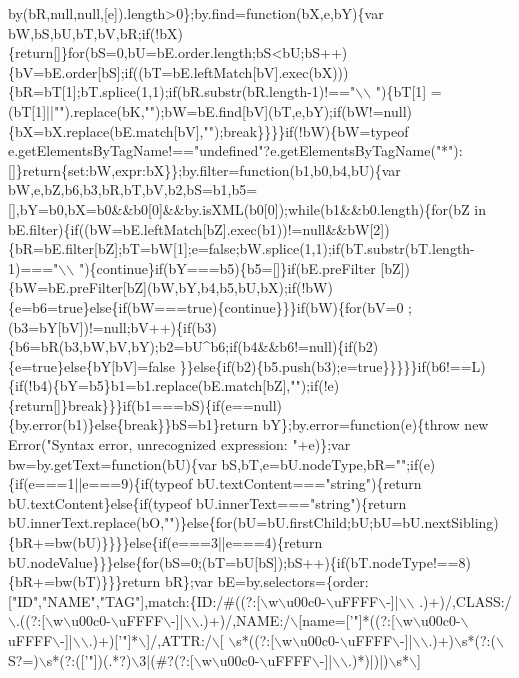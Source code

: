 \begin{DoxyCode}
{       by(bR,null,null,[e]).length>0\};by.find=function(bX,e,bY)\{var
       bW,bS,bU,bT,bV,bR;if(!bX)\{return[]\}for(bS=0,bU=bE.order.length;bS<bU;bS++)\{bV=bE.order[bS];if((bT=bE.leftMatch[bV].exec(bX)))\{bR=bT[1];bT.splice(1,1);if(bR.substr(bR.length-1)!=="\(\backslash\)\(\backslash\)
      ")\{bT[1]
      =(bT[1]||"").replace(bK,"");bW=bE.find[bV](bT,e,bY);if(bW!=null)\{bX=bX.replace(bE.match[bV],"");break\}\}\}\}if(!bW)\{bW=typeof
       e.getElementsByTagName!=="undefined"?e.getElementsByTagName("*"):[]\}return\{set:bW,expr:bX\}\};by.filter=function(b1,b0,b4,bU)\{var
       bW,e,bZ,b6,b3,bR,bT,bV,b2,bS=b1,b5=[],bY=b0,bX=b0&&b0[0]&&by.isXML(b0[0]);while(b1&&b0.length)\{for(bZ in
       bE.filter)\{if((bW=bE.leftMatch[bZ].exec(b1))!=null&&bW[2])\{bR=bE.filter[bZ];bT=bW[1];e=false;bW.splice(1,1);if(bT.substr(bT.length-1)==="\(\backslash\)\(\backslash\)
      ")\{continue\}if(bY===b5)\{b5=[]\}if(bE.preFilter
      [bZ])\{bW=bE.preFilter[bZ](bW,bY,b4,b5,bU,bX);if(!bW)\{e=b6=true\}else\{if(bW===true)\{continue\}\}\}if(bW)\{for(bV=0
      ;(b3=bY[bV])!=null;bV++)\{if(b3)\{b6=bR(b3,bW,bV,bY);b2=bU^b6;if(b4&&b6!=null)\{if(b2)\{e=true\}else\{bY[bV]=false
      \}\}else\{if(b2)\{b5.push(b3);e=true\}\}\}\}\}if(b6!==L)\{if(!b4)\{bY=b5\}b1=b1.replace(bE.match[bZ],"");if(!e)\{return[]\}break\}\}\}if(b1===bS)\{if(e==null)\{by.error(b1)\}else\{break\}\}bS=b1\}return bY\};by.error=function(e)\{throw new
       Error("Syntax error, unrecognized expression: "+e)\};var bw=by.getText=function(bU)\{var
       bS,bT,e=bU.nodeType,bR="";if(e)\{if(e===1||e===9)\{if(typeof bU.textContent==="string")\{return bU.textContent\}else\{if(typeof
       bU.innerText==="string")\{return
       bU.innerText.replace(bO,"")\}else\{for(bU=bU.firstChild;bU;bU=bU.nextSibling)\{bR+=bw(bU)\}\}\}\}else\{if(e===3||e===4)\{return
       bU.nodeValue\}\}\}else\{for(bS=0;(bT=bU[bS]);bS++)\{if(bT.nodeType!==8)\{bR+=bw(bT)\}\}\}return bR\};var bE=by.selectors=\{order:["ID","NAME","TAG"],match:\{ID:/#((?:[\(\backslash\)w\(\backslash\)u00c0-\(\backslash\)uFFFF\(\backslash\)-]|\(\backslash\)\(\backslash\)
      .)+)/,CLASS:/\(\backslash\).((?:[\(\backslash\)w\(\backslash\)u00c0-\(\backslash\)uFFFF\(\backslash\)-]|\(\backslash\)\(\backslash\).)+)/,NAME:/\(\backslash\)[name=['}\textcolor{stringliteral}{"]*((?:[\(\backslash\)w\(\backslash\)u00c0-\(\backslash\)uFFFF\(\backslash\)-]|\(\backslash\)\(\backslash\).)+)['"}]*\(\backslash\)]/,ATTR:/\(\backslash\)[
      \(\backslash\)s*((?:[\(\backslash\)w\(\backslash\)u00c0-\(\backslash\)uFFFF\(\backslash\)-]|\(\backslash\)\(\backslash\).)+)\(\backslash\)s*(?:(\(\backslash\)S?=)\(\backslash\)s*(?:([\textcolor{stringliteral}{'"])(.*?)\(\backslash\)3|(#?(?:[\(\backslash\)w\(\backslash\)u00c0-\(\backslash\)uFFFF\(\backslash\)-]|\(\backslash\)\(\backslash\).)*)|)|)\(\backslash\)s*\(\backslash\)]
}
\end{DoxyCode}
